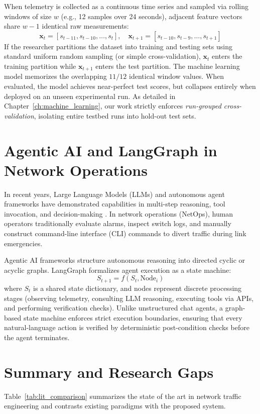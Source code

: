 When telemetry is collected as a continuous time series and sampled via rolling windows of size $w$ (e.g., 12 samples over 24 seconds), adjacent feature vectors share $w-1$ identical raw measurements:
\begin{equation}
  \mathbf{x}_t = [s_{t-11}, s_{t-10}, \dots, s_t], \quad \mathbf{x}_{t+1} = [s_{t-10}, s_{t-9}, \dots, s_{t+1}]
\end{equation}
If the researcher partitions the dataset into training and testing sets using standard uniform random sampling (or simple cross-validation), $\mathbf{x}_t$ enters the training partition while $\mathbf{x}_{t+1}$ enters the test partition. The machine learning model memorizes the overlapping $11/12$ identical window values. When evaluated, the model achieves near-perfect test scores, but collapses entirely when deployed on an unseen experimental run. As detailed in Chapter~\ref{ch:machine_learning}, our work strictly enforces \textit{run-grouped cross-validation}, isolating entire testbed runs into hold-out test sets.

\section{Agentic AI and LangGraph in Network Operations}
In recent years, Large Language Models (LLMs) and autonomous agent frameworks have demonstrated capabilities in multi-step reasoning, tool invocation, and decision-making \cite{langgraph2024}. In network operations (NetOps), human operators traditionally evaluate alarms, inspect switch logs, and manually construct command-line interface (CLI) commands to divert traffic during link emergencies.

Agentic AI frameworks structure autonomous reasoning into directed cyclic or acyclic graphs. LangGraph \cite{langgraph2024} formalizes agent execution as a state machine:
\begin{equation}
  S_{t+1} = f(S_t, \text{Node}_i)
\end{equation}
where $S_t$ is a shared state dictionary, and nodes represent discrete processing stages (observing telemetry, consulting LLM reasoning, executing tools via APIs, and performing verification checks). Unlike unstructured chat agents, a graph-based state machine enforces strict execution boundaries, ensuring that every natural-language action is verified by deterministic post-condition checks before the agent terminates.

\section{Summary and Research Gaps}
Table~\ref{tab:lit_comparison} summarizes the state of the art in network traffic engineering and contrasts existing paradigms with the proposed system.

